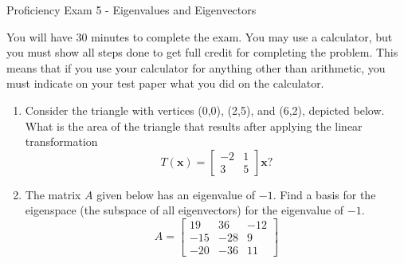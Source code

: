 \documentclass[14pt]{article}
\begin{document}
\begin{center}
Proficiency Exam 5 - Eigenvalues and Eigenvectors
\end{center}

You will have 30 minutes to complete the exam.  You may use a calculator, but you must show all steps done to get full credit for completing the problem.  This means that if you use your calculator for anything other than arithmetic, you must indicate on your test paper what you did on the calculator.

\begin{enumerate}

\item Consider the triangle with vertices (0,0), (2,5), and (6,2), depicted below.  What is the area of the triangle that results after applying the linear transformation
\[
T(\mathbf{x}) = \left[\begin{array}{cc} -2 & 1 \\ 3 & 5 \end{array}\right] \mathbf{x}?
\]

\begin{center}
\end{center}

\item The matrix $ A $ given below has an eigenvalue of $ -1 $.  Find a basis for the eigenspace (the subspace of all eigenvectors) for the eigenvalue of $ -1 $.
\[
A = \left[\begin{array}{ccc} 19 & 36 & -12 \\ -15 & -28 & 9 \\ -20 & -36 & 11 \end{array}\right]
\]


\end{enumerate}
\end{document}
